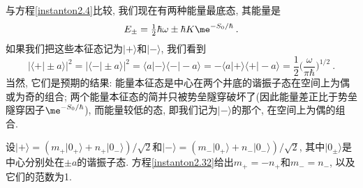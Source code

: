 与方程\eqref{instanton2.4}比较, 我们现在有两种能量最底态, 其能量是
\begin{equation}
    E_{\pm} = \tfrac{1}{2}\hbar\omega \pm \hbar K \me^{-S_{0}/\hbar} \:. \label{instanton2.31}
\end{equation}
如果我们把这些本征态记为$\lvert + \rangle$和$\lvert - \rangle$, 我们看到
\begin{equation}
    \bigl \lvert \langle + \vert {\pm} a \rangle \bigr \rvert^{2} = \bigl \lvert \langle - \vert {\pm} a \rangle \bigr \rvert^{2} 
    =\langle a\vert -\rangle \langle - \vert {-}a\rangle =-\langle a\vert +\rangle \langle + \vert {-}a\rangle 
    =\frac{1}{2} \biggl(\frac{\omega}{\pi\hbar}\biggr)^{1/2} \:. \label{instanton2.32}
\end{equation}
当然, 它们是预期的结果: 能量本征态是中心在两个井底的谐振子态在空间上为偶或为奇的组合; 两个能量本征态的简并只被势垒隧穿破坏了(因此能量差正比于势垒隧穿因子$\me^{-S_{0}/\hbar}$), 而能量较低的态, 即我们记为$\lvert -\rangle$的那个, 在空间上为偶的组合. \\
\begin{remark}
设$\vert + \rangle= (m_{+}\lvert 0_{+}\rangle+n_{+}\lvert 0_{-}\rangle)/\sqrt{2}$和$\vert - \rangle= (m_{-}\lvert 0_{+}\rangle+n_{-}\lvert 0_{-}\rangle)/\sqrt{2}$, 其中$\lvert 0_{\pm}\rangle$是中心分别处在$\pm a$的谐振子态. 方程\eqref{instanton2.32}给出$m_{+}=-n_{+}$和$m_{-}=n_{-}$, 以及它们的范数为1.
\end{remark}

